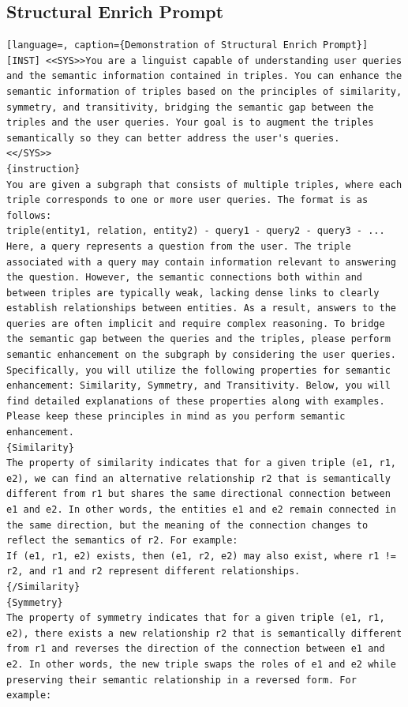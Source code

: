 \documentclass[11pt]{article}
\begin{document}
\subsection{Structural Enrich Prompt}
\begin{lstlisting}[language=, caption={Demonstration of Structural Enrich Prompt}]
[INST] <<SYS>>You are a linguist capable of understanding user queries and the semantic information contained in triples. You can enhance the semantic information of triples based on the principles of similarity, symmetry, and transitivity, bridging the semantic gap between the triples and the user queries. Your goal is to augment the triples semantically so they can better address the user's queries.
<</SYS>>
{instruction}
You are given a subgraph that consists of multiple triples, where each triple corresponds to one or more user queries. The format is as follows:
triple(entity1, relation, entity2) - query1 - query2 - query3 - ...
Here, a query represents a question from the user. The triple associated with a query may contain information relevant to answering the question. However, the semantic connections both within and between triples are typically weak, lacking dense links to clearly establish relationships between entities. As a result, answers to the queries are often implicit and require complex reasoning. To bridge the semantic gap between the queries and the triples, please perform semantic enhancement on the subgraph by considering the user queries.
Specifically, you will utilize the following properties for semantic enhancement: Similarity, Symmetry, and Transitivity. Below, you will find detailed explanations of these properties along with examples. Please keep these principles in mind as you perform semantic enhancement.
{Similarity}
The property of similarity indicates that for a given triple (e1, r1, e2), we can find an alternative relationship r2 that is semantically different from r1 but shares the same directional connection between e1 and e2. In other words, the entities e1 and e2 remain connected in the same direction, but the meaning of the connection changes to reflect the semantics of r2. For example:
If (e1, r1, e2) exists, then (e1, r2, e2) may also exist, where r1 != r2, and r1 and r2 represent different relationships.
{/Similarity}
{Symmetry}
The property of symmetry indicates that for a given triple (e1, r1, e2), there exists a new relationship r2 that is semantically different from r1 and reverses the direction of the connection between e1 and e2. In other words, the new triple swaps the roles of e1 and e2 while preserving their semantic relationship in a reversed form. For example:

\end{lstlisting}
\end{document}
